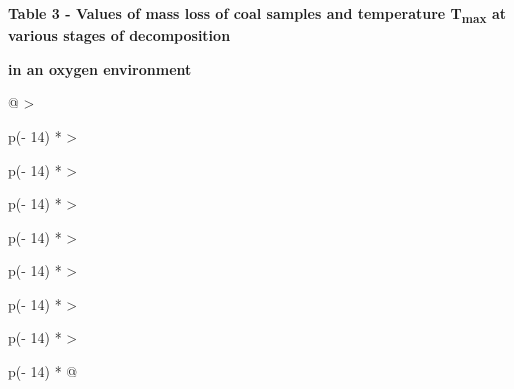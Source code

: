 {\bfseries Table 3 - Values of mass loss of coal samples and temperature
T\textsubscript{max} at various stages of decomposition}

{\bfseries in an oxygen environment}

\begin{longtable}[]{@{}
  >{\raggedright\arraybackslash}p{(\columnwidth - 14\tabcolsep) * }
  >{\raggedright\arraybackslash}p{(\columnwidth - 14\tabcolsep) * }
  >{\raggedright\arraybackslash}p{(\columnwidth - 14\tabcolsep) * }
  >{\raggedright\arraybackslash}p{(\columnwidth - 14\tabcolsep) * }
  >{\raggedright\arraybackslash}p{(\columnwidth - 14\tabcolsep) * }
  >{\raggedright\arraybackslash}p{(\columnwidth - 14\tabcolsep) * }
  >{\raggedright\arraybackslash}p{(\columnwidth - 14\tabcolsep) * }
  >{\raggedright\arraybackslash}p{(\columnwidth - 14\tabcolsep) * }@{}}
\toprule\noalign{}
\end{longtable}
